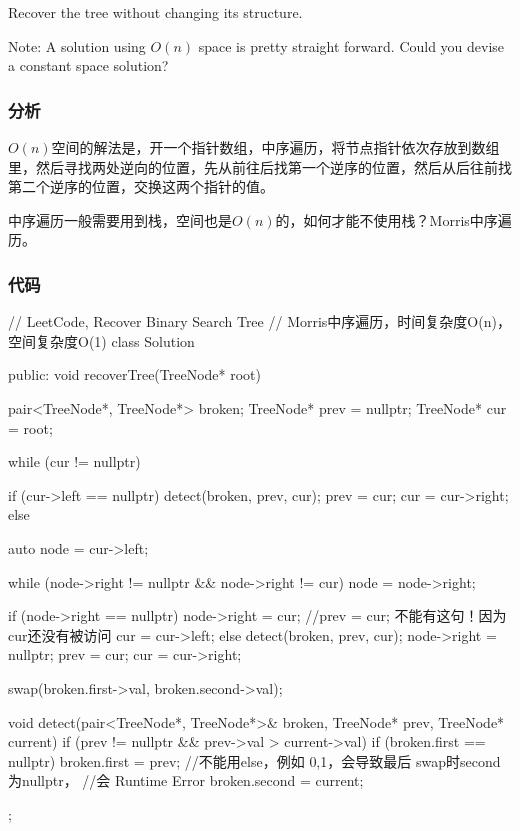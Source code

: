 Recover the tree without changing its structure.

Note: A solution using $O(n)$ space is pretty straight forward. Could you devise a constant space solution?


\subsubsection{分析}
$O(n)$空间的解法是，开一个指针数组，中序遍历，将节点指针依次存放到数组里，然后寻找两处逆向的位置，先从前往后找第一个逆序的位置，然后从后往前找第二个逆序的位置，交换这两个指针的值。

中序遍历一般需要用到栈，空间也是$O(n)$的，如何才能不使用栈？Morris中序遍历。


\subsubsection{代码}

\begin{Code}
// LeetCode, Recover Binary Search Tree
// Morris中序遍历，时间复杂度O(n)，空间复杂度O(1)
class Solution {
public:
    void recoverTree(TreeNode* root) {
        pair<TreeNode*, TreeNode*> broken;
        TreeNode* prev = nullptr;
        TreeNode* cur = root;

        while (cur != nullptr) {
            if (cur->left == nullptr) {
                detect(broken, prev, cur);
                prev = cur;
                cur = cur->right;
            } else {
                auto node = cur->left;

                while (node->right != nullptr && node->right != cur)
                    node = node->right;

                if (node->right == nullptr) {
                    node->right = cur;
                    //prev = cur; 不能有这句！因为cur还没有被访问
                    cur = cur->left;
                } else {
                    detect(broken, prev, cur);
                    node->right = nullptr;
                    prev = cur;
                    cur = cur->right;
                }
            }
        }

        swap(broken.first->val, broken.second->val);
    }

    void detect(pair<TreeNode*, TreeNode*>& broken, TreeNode* prev,
            TreeNode* current) {
        if (prev != nullptr && prev->val > current->val) {
            if (broken.first == nullptr) {
                broken.first = prev;
            } //不能用else，例如 {0,1}，会导致最后 swap时second为nullptr，
              //会 Runtime Error
            broken.second = current;
        }
    }
};
\end{Code}


